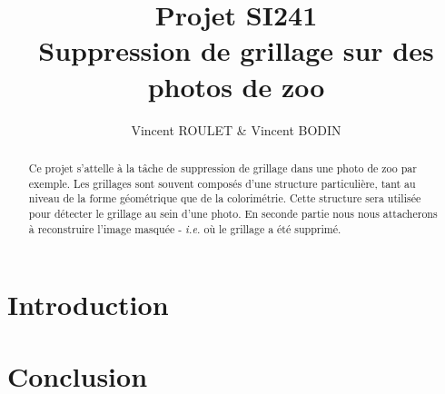 \documentclass[10pt,a4paper]{article}
\title{Projet SI241 \\
Suppression de grillage sur des photos de zoo}
\author{Vincent ROULET \& Vincent BODIN}
\date{}
\begin{document}
\maketitle

\hrulefill
\vspace{2cm}
\renewcommand{\abstractname}{Résumé}
\begin{abstract}
Ce projet s'attelle à la tâche de suppression de grillage dans une photo de zoo par exemple. Les grillages sont souvent composés d'une structure particulière, tant au niveau de la forme géométrique que de la colorimétrie. Cette structure sera utilisée pour détecter le grillage au sein d'une photo. En seconde partie nous nous attacherons à reconstruire l'image masquée - \emph{i.e.} où le grillage a été supprimé.
\end{abstract}

\newpage
\tableofcontents
\newpage

\section*{Introduction}










\section*{Conclusion}




\newpage



\end{document}
